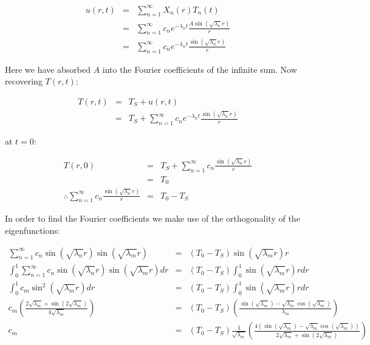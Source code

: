 \documentclass{report}
\begin{document}
\begin{eqnarray*} 
u(r, t) & = & \sum_{n = 1}^{\infty} X_n(r)T_n(t) \\
        & = & \sum_{n = 1}^{\infty} c_n  e^{-\lambda_n t} \frac{A \sin(\sqrt{\lambda_n}r)}{r} \\
        & = & \sum_{n = 1}^{\infty} c_n  e^{-\lambda_n t} \frac{\sin(\sqrt{\lambda_n}r)}{r}
\end{eqnarray*}\medskip

Here we have absorbed $A$ into the Fourier coefficients of the infinite sum. Now recovering 
$T(r, t)$:\bigskip

\begin{eqnarray*} 
T(r, t) & = & T_S + u(r, t) \\
        & = & T_S + \sum_{n = 1}^{\infty} c_n  e^{-\lambda_n t} \frac{\sin(\sqrt{\lambda_n}r)}{r} 
\end{eqnarray*}\medskip

at $t = 0$:\bigskip

\begin{eqnarray*} 
                                                               T(r, 0) & = & T_S + \sum_{n = 1}^{\infty} c_n \frac{\sin(\sqrt{\lambda_n}r)}{r} \\
                                                                       & = & T_0 \\
\therefore \sum_{n = 1}^{\infty} c_n \frac{\sin(\sqrt{\lambda_n}r)}{r} & = & T_0 - T_S
\end{eqnarray*}\medskip

In order to find the Fourier coefficients we make use of the orthogonality of the eigenfunctions:\bigskip

\begin{eqnarray*} 
\sum_{n = 1}^{\infty} c_n \sin(\sqrt{\lambda_n}r) \sin(\sqrt{\lambda_m}r) 
  & = & (T_0 - T_S) \sin(\sqrt{\lambda_m}r) r \\
\int_0^1 \sum_{n = 1}^{\infty} c_n \sin(\sqrt{\lambda_n}r) \sin(\sqrt{\lambda_m}r) dr 
  & = & (T_0 - T_S) \int_0^1 \sin(\sqrt{\lambda_m}r) r dr \\
\int_0^1 c_m \sin^2(\sqrt{\lambda_m}r) dr 
  & = & (T_0 - T_S) \int_0^1 \sin(\sqrt{\lambda_m}r) r dr \\
c_m \left( \frac{2\sqrt{\lambda_m} + \sin(2\sqrt{\lambda_m})} {4\sqrt{\lambda_m}} \right) 
  & = & (T_0 - T_S) \left( \frac{\sin(\sqrt{\lambda_m}) - \sqrt{\lambda_m}\cos(\sqrt{\lambda_m})} {\lambda_m} \right) \\
c_m 
  & = & (T_0 - T_S) \frac{1}{\sqrt{\lambda_m}} \left( \frac{4 (\sin(\sqrt{\lambda_m}) - \sqrt{\lambda_m}\cos(\sqrt{\lambda_m}))} {2\sqrt{\lambda_m} + \sin(2\sqrt{\lambda_m})} \right)
\end{eqnarray*}\medskip
\end{document}
